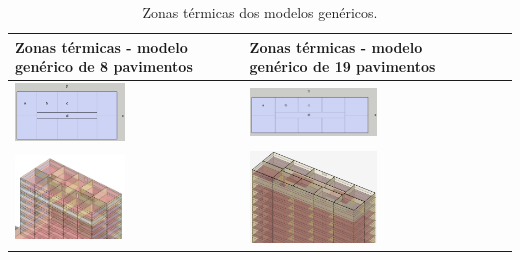 \begin{table}[H]
    \centering
    \small
    \caption{Zonas térmicas dos modelos genéricos.}
    \begin{tabular*}{\columnwidth}{@{\extracolsep{\fill}}ll}\hline
        \makecell[c]{Zonas térmicas - modelo\\ genérico de 8 pavimentos}                    & \makecell[c]{Zonas térmicas - modelo \\genérico de 19 pavimentos}                 \\ \hline
        \includegraphics[width=0.5\textwidth]{figures/tab9-pb-8pav.png}                     & \includegraphics[width=0.5\textwidth]{figures/tab9-pb-19pav.png}                  \\
        \includegraphics[width=0.5\textwidth]{figures/tab9-CEP_8pav-v3-7.png}               & \includegraphics[width=0.5\textwidth]{figures/tab9-corte-19pav-v1.png}            \\ \hline

\end{tabular*}
\end{table}
